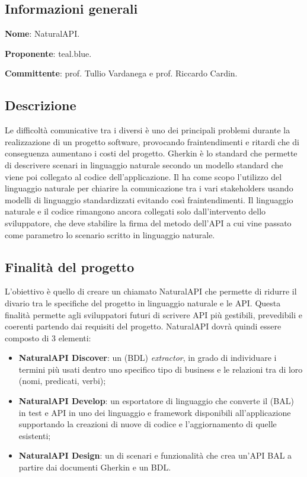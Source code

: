 \documentclass[../studio-di-fattibilita.tex]{subfiles}
\begin{document}
\subsection{Informazioni generali}%
\label{sub:informazioni_generale}
\begin{description}
  \item \textbf{Nome}: NaturalAPI.
  \item \textbf{Proponente}: teal.blue.
  \item \textbf{Committente}: prof. Tullio Vardanega e prof. Riccardo Cardin.
\end{description}

\subsection{Descrizione}%
\label{descrizione}
Le difficoltà comunicative tra i diversi  è uno dei principali problemi durante la realizzazione di un progetto software, provocando fraintendimenti e ritardi che di conseguenza aumentano i costi del progetto. Gherkin è lo standard che permette di descrivere scenari in linguaggio naturale secondo un modello standard che viene poi collegato al codice dell'applicazione. Il  ha come scopo l'utilizzo del linguaggio naturale per chiarire la comunicazione tra i vari stakeholders usando modelli di linguaggio standardizzati evitando così fraintendimenti. Il linguaggio naturale e il codice rimangono ancora collegati solo dall'intervento dello sviluppatore, che deve stabilire la firma del metodo dell'API a cui vine passato come parametro lo scenario scritto in linguaggio naturale.

\subsection{Finalità del progetto}%
\label{finalita_del_progetto}
L'obiettivo è quello di creare un   chiamato NaturalAPI che permette di ridurre il divario tra le specifiche del progetto in linguaggio naturale e le API. Questa finalità permette agli sviluppatori futuri di scrivere API più gestibili, prevedibili e coerenti partendo dai requisiti del progetto. NaturalAPI dovrà quindi essere composto di 3 elementi:
\begin{itemize}
  \item \textbf{NaturalAPI Discover}: un  (BDL) \textit{extractor}, in grado di individuare i termini più usati dentro uno specifico tipo di business e le relazioni tra di loro (nomi, predicati, verbi);
  \item \textbf{NaturalAPI Develop}: un esportatore di linguaggio che converte il  (BAL) in test e API in uno dei linguaggio e framework disponibili all'applicazione supportando la creazioni di nuove  di codice e l'aggiornamento di quelle esistenti;
  \item \textbf{NaturalAPI Design}: un  di scenari e funzionalità che crea un'API BAL a partire dai documenti Gherkin e un BDL.
\end{itemize}
\end{document}
